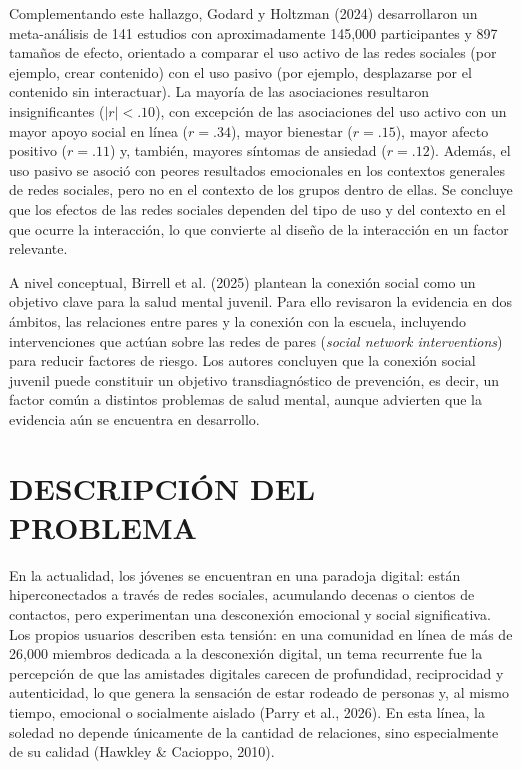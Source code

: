 Complementando este hallazgo, Godard y Holtzman (2024) desarrollaron un meta-análisis de 141 estudios con aproximadamente 145,000 participantes y 897 tamaños de efecto, orientado a comparar el uso activo de las redes sociales (por ejemplo, crear contenido) con el uso pasivo (por ejemplo, desplazarse por el contenido sin interactuar). La mayoría de las asociaciones resultaron insignificantes ($|r| < .10$), con excepción de las asociaciones del uso activo con un mayor apoyo social en línea ($r = .34$), mayor bienestar ($r = .15$), mayor afecto positivo ($r = .11$) y, también, mayores síntomas de ansiedad ($r = .12$). Además, el uso pasivo se asoció con peores resultados emocionales en los contextos generales de redes sociales, pero no en el contexto de los grupos dentro de ellas. Se concluye que los efectos de las redes sociales dependen del tipo de uso y del contexto en el que ocurre la interacción, lo que convierte al diseño de la interacción en un factor relevante.

A nivel conceptual, Birrell et al. (2025) plantean la conexión social como un objetivo clave para la salud mental juvenil. Para ello revisaron la evidencia en dos ámbitos, las relaciones entre pares y la conexión con la escuela, incluyendo intervenciones que actúan sobre las redes de pares (\textit{social network interventions}) para reducir factores de riesgo. Los autores concluyen que la conexión social juvenil puede constituir un objetivo transdiagnóstico de prevención, es decir, un factor común a distintos problemas de salud mental, aunque advierten que la evidencia aún se encuentra en desarrollo.

\section{DESCRIPCIÓN DEL PROBLEMA}
En la actualidad, los jóvenes se encuentran en una paradoja digital: están hiperconectados a través de redes sociales, acumulando decenas o cientos de contactos, pero experimentan una desconexión emocional y social significativa. Los propios usuarios describen esta tensión: en una comunidad en línea de más de 26,000 miembros dedicada a la desconexión digital, un tema recurrente fue la percepción de que las amistades digitales carecen de profundidad, reciprocidad y autenticidad, lo que genera la sensación de estar rodeado de personas y, al mismo tiempo, emocional o socialmente aislado (Parry et al., 2026). En esta línea, la soledad no depende únicamente de la cantidad de relaciones, sino especialmente de su calidad (Hawkley \& Cacioppo, 2010).

